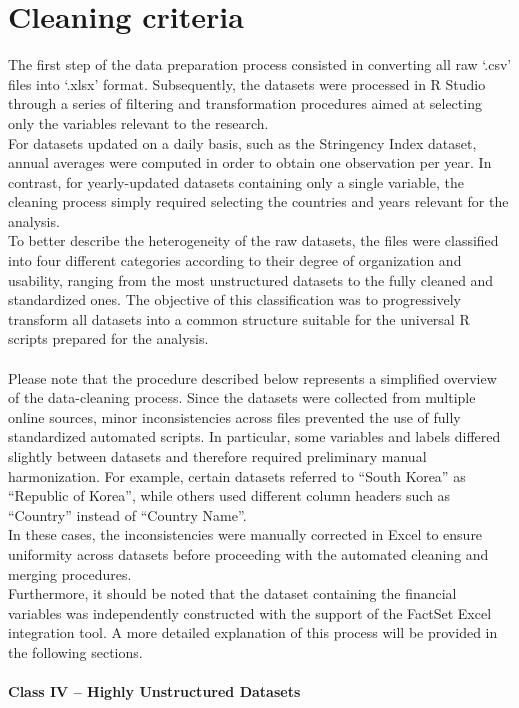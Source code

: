 \section{Cleaning criteria}
The first step of the data preparation process consisted in converting all raw ‘.csv’ files into ‘.xlsx’ format. Subsequently, the datasets were processed in R Studio through a series of filtering and transformation procedures aimed at selecting only the variables relevant to the research.
\\
For datasets updated on a daily basis, such as the Stringency Index dataset, annual averages were computed in order to obtain one observation per year. In contrast, for yearly-updated datasets containing only a single variable, the cleaning process simply required selecting the countries and years relevant for the analysis.
\\
To better describe the heterogeneity of the raw datasets, the files were classified into four different categories according to their degree of organization and usability, ranging from the most unstructured datasets to the fully cleaned and standardized ones. The objective of this classification was to progressively transform all datasets into a common structure suitable for the universal R scripts prepared for the analysis.
\\\\
Please note that the procedure described below represents a simplified overview of the data-cleaning process. Since the datasets were collected from multiple online sources, minor inconsistencies across files prevented the use of fully standardized automated scripts. In particular, some variables and labels differed slightly between datasets and therefore required preliminary manual harmonization. For example, certain datasets referred to “South Korea” as “Republic of Korea”, while others used different column headers such as “Country” instead of “Country Name”.\\
In these cases, the inconsistencies were manually corrected in Excel to ensure uniformity across datasets before proceeding with the automated cleaning and merging procedures.\\
Furthermore, it should be noted that the dataset containing the financial variables was independently constructed with the support of the FactSet Excel integration tool. A more detailed explanation of this process will be provided in the following sections.
\\\\
\textbf{Class IV – Highly Unstructured Datasets}\\
